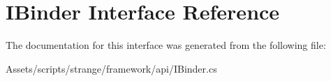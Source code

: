 \hypertarget{interface_i_binder}{\section{I\-Binder Interface Reference}
\label{interface_i_binder}
}


The documentation for this interface was generated from the following file\-:\begin{DoxyCompactItemize}
\item 
Assets/scripts/strange/framework/api/I\-Binder.\-cs\end{DoxyCompactItemize}
